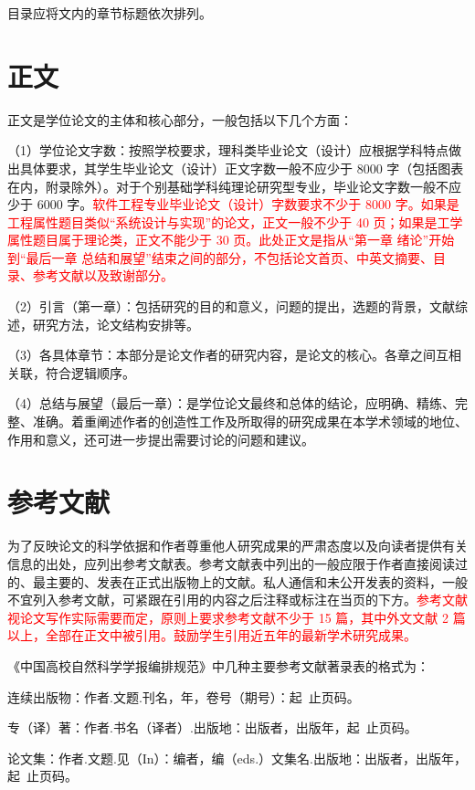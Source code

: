 目录应将文内的章节标题依次排列。

\section{正文}

正文是学位论文的主体和核心部分，一般包括以下几个方面：

（1）学位论文字数：按照学校要求，理科类毕业论文（设计）应根据学科特点做出具体要求，其学生毕业论文（设计）正文字数一般不应少于 8000 字（包括图表在内，附录除外）。对于个别基础学科纯理论研究型专业，毕业论文字数一般不应少于 6000 字。\textcolor{red}{软件工程专业毕业论文（设计）字数要求不少于 8000 字。如果是工程属性题目类似“系统设计与实现”的论文，正文一般不少于 40 页；如果是工学属性题目属于理论类，正文不能少于 30 页。此处正文是指从“第一章 绪论”开始到“最后一章 总结和展望”结束之间的部分，不包括论文首页、中英文摘要、目录、参考文献以及致谢部分。}

（2）引言（第一章）：包括研究的目的和意义，问题的提出，选题的背景，文献综述，研究方法，论文结构安排等。

（3）各具体章节：本部分是论文作者的研究内容，是论文的核心。各章之间互相关联，符合逻辑顺序。

（4）总结与展望（最后一章）：是学位论文最终和总体的结论，应明确、精练、完整、准确。着重阐述作者的创造性工作及所取得的研究成果在本学术领域的地位、作用和意义，还可进一步提出需要讨论的问题和建议。

\section{参考文献}

为了反映论文的科学依据和作者尊重他人研究成果的严肃态度以及向读者提供有关信息的出处，应列出参考文献表。参考文献表中列出的一般应限于作者直接阅读过的、最主要的、发表在正式出版物上的文献。私人通信和未公开发表的资料，一般不宜列入参考文献，可紧跟在引用的内容之后注释或标注在当页的下方。\textcolor{red}{参考文献视论文写作实际需要而定，原则上要求参考文献不少于 15 篇，其中外文文献 2 篇以上，全部在正文中被引用。鼓励学生引用近五年的最新学术研究成果。}

《中国高校自然科学学报编排规范》中几种主要参考文献著录表的格式为：

连续出版物：作者.文题.刊名，年，卷号（期号）：起~止页码。

专（译）著：作者.书名（译者）.出版地：出版者，出版年，起~止页码。

论文集：作者.文题.见（In）：编者，编（eds.）文集名.出版地：出版者，出版年，起~止页码。


